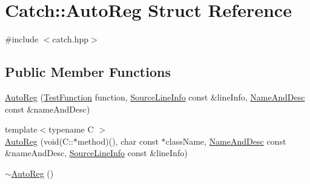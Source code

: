 \hypertarget{structCatch_1_1AutoReg}{\section{Catch\-:\-:Auto\-Reg Struct Reference}
\label{structCatch_1_1AutoReg}
}


{\ttfamily \#include $<$catch.\-hpp$>$}

\subsection*{Public Member Functions}
\begin{DoxyCompactItemize}
\item 
\hyperlink{structCatch_1_1AutoReg_af224f4568d57b8652474df475a164a8c}{Auto\-Reg} (\hyperlink{namespaceCatch_a768da872b9033e4c71c6f316393d35db}{Test\-Function} function, \hyperlink{structCatch_1_1SourceLineInfo}{Source\-Line\-Info} const \&line\-Info, \hyperlink{structCatch_1_1NameAndDesc}{Name\-And\-Desc} const \&name\-And\-Desc)
\item 
{\footnotesize template$<$typename C $>$ }\\\hyperlink{structCatch_1_1AutoReg_a1bf9207fe0a02b46dc0ab1cc03cbe738}{Auto\-Reg} (void(C\-::$\ast$method)(), char const $\ast$class\-Name, \hyperlink{structCatch_1_1NameAndDesc}{Name\-And\-Desc} const \&name\-And\-Desc, \hyperlink{structCatch_1_1SourceLineInfo}{Source\-Line\-Info} const \&line\-Info)
\item 
\hyperlink{structCatch_1_1AutoReg_a3cdb53f1e5ff115310f3372bebe198f1}{$\sim$\-Auto\-Reg} ()
\end{DoxyCompactItemize}


